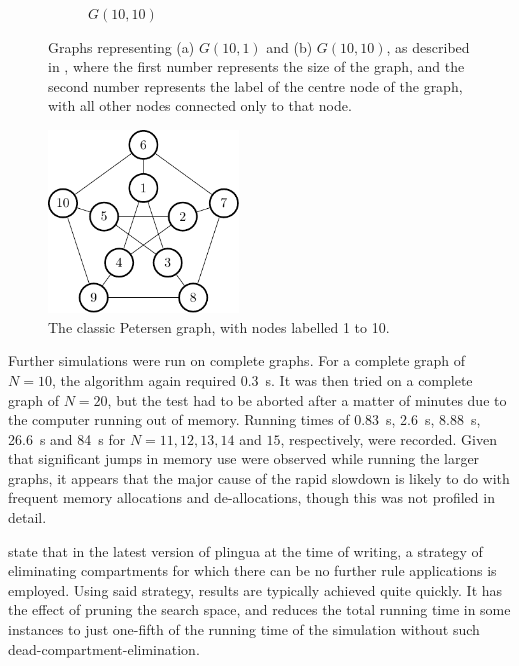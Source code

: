 \begin{figure}
\begin{subfigure}[b]{0.35\textwidth}
        \caption{\label{fig:gcol:g-10-10}\(G(10,10)\)}
    \end{subfigure}
    \caption[Graphs representing \(G(10,1)\) and \(G(10,10)\)]{\label{fig:gcol:gs}Graphs representing (a) \(G(10,1)\) and (b) \(G(10,10)\), as described in \cite{Gheorghe2013}, where the first number represents the size of the graph, and the second number represents the label of the centre node of the graph, with all other nodes connected only to that node.}
\end{figure}

\begin{figure}
    \centering
    \includegraphics[width=0.45\textwidth]{chapters/gcol/figs/petersen-figure0.pdf}
    \caption[The Petersen Graph]{\label{fig:gcol:petersen}The classic Petersen graph, with nodes labelled 1 to 10.}
\end{figure}

Further simulations were run on complete graphs.  For a complete graph of \(N = 10\), the algorithm again required \qty{0.3}{\second}.  It was then tried on a complete graph of \(N = 20\), but the test had to be aborted after a matter of minutes due to the computer running out of memory.  Running times of \qty{0.83}{\second}, \qty{2.6}{\second}, \qty{8.88}{\second}, \qty{26.6}{\second} and \qty{84}{\second} for \(N = 11, 12, 13, 14\) and \(15\), respectively, were recorded.  Given that significant jumps in memory use were observed while running the larger graphs, it appears that the major cause of the rapid slowdown is likely to do with frequent \adhoc{} memory allocations and de-allocations, though this was not profiled in detail.

\citeauthor{Gheorghe2013} state \cite[p.~828]{Gheorghe2013} that in the latest version of \gls{plingua} at the time of writing, a strategy of eliminating compartments for which there can be no further rule applications is employed.  Using said strategy, results are typically achieved quite quickly.  It has the effect of pruning the search space, and reduces the total running time in some instances to just one-fifth of the running time of the simulation without such dead-compartment-elimination.

